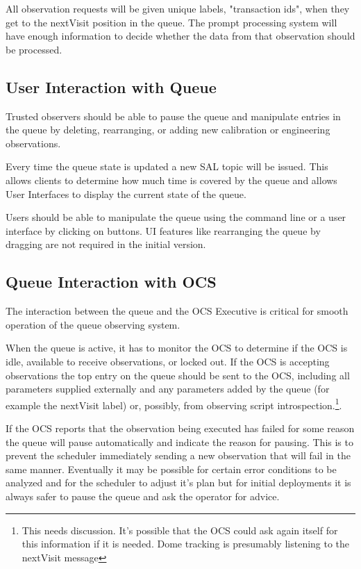 \documentclass[TS,toc,lsstdraft]{lsstdoc}
\begin{document}
All observation requests will be given unique labels, "transaction ids", when they get to the nextVisit position in the queue.
The prompt processing system will have enough information to decide whether the data from that observation should be processed.

\subsection{User Interaction with Queue}

Trusted observers should be able to pause the queue and manipulate entries in the queue by deleting, rearranging, or adding new calibration or engineering observations.

Every time the queue state is updated a new SAL topic will be issued.
This allows clients to determine how much time is covered by the queue and allows User Interfaces to display the current state of the queue.

Users should be able to manipulate the queue using the command line or a user interface by clicking on buttons.
UI features like rearranging the queue by dragging are not required in the initial version.

\subsection{Queue Interaction with OCS}

The interaction between the queue and the OCS Executive is critical for smooth operation of the queue observing system.

When the queue is active, it has to monitor the OCS to determine if the OCS is idle, available to receive observations, or locked out.
If the OCS is accepting observations the top entry on the queue should be sent to the OCS, including all parameters supplied externally and any parameters added by the queue (for example the nextVisit label) or, possibly, from observing script introspection.\footnote{This needs discussion. It's possible that the OCS could ask again itself for this information if it is needed. Dome tracking is presumably listening to the nextVisit message}.

If the OCS reports that the observation being executed has failed for some reason the queue will pause automatically and indicate the reason for pausing.
This is to prevent the scheduler immediately sending a new observation that will fail in the same manner.
Eventually it may be possible for certain error conditions to be analyzed and for the scheduler to adjust it's plan but for initial deployments it is always safer to pause the queue and ask the operator for advice.
\end{document}

